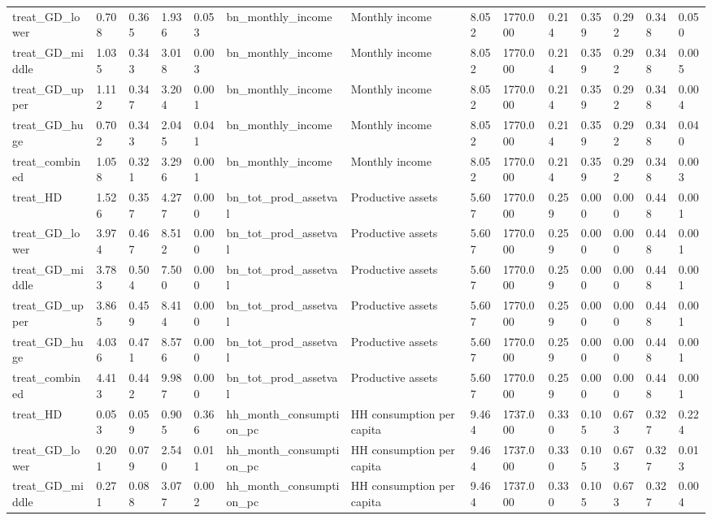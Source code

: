 \begin{tabular}{llllllllllllll}
treat\_GD\_lower & 0.708 & 0.365 & 1.936 & 0.053 & bn\_monthly\_income & Monthly income & 8.052 & 1770.000 & 0.214 & 0.359 & 0.292 & 0.348 & 0.050 \\
treat\_GD\_middle & 1.035 & 0.343 & 3.018 & 0.003 & bn\_monthly\_income & Monthly income & 8.052 & 1770.000 & 0.214 & 0.359 & 0.292 & 0.348 & 0.005 \\
treat\_GD\_upper & 1.112 & 0.347 & 3.204 & 0.001 & bn\_monthly\_income & Monthly income & 8.052 & 1770.000 & 0.214 & 0.359 & 0.292 & 0.348 & 0.004 \\
treat\_GD\_huge & 0.702 & 0.343 & 2.045 & 0.041 & bn\_monthly\_income & Monthly income & 8.052 & 1770.000 & 0.214 & 0.359 & 0.292 & 0.348 & 0.040 \\
treat\_combined & 1.058 & 0.321 & 3.296 & 0.001 & bn\_monthly\_income & Monthly income & 8.052 & 1770.000 & 0.214 & 0.359 & 0.292 & 0.348 & 0.003 \\
treat\_HD & 1.526 & 0.357 & 4.277 & 0.000 & bn\_tot\_prod\_assetval & Productive assets & 5.607 & 1770.000 & 0.259 & 0.000 & 0.000 & 0.448 & 0.001 \\
treat\_GD\_lower & 3.974 & 0.467 & 8.512 & 0.000 & bn\_tot\_prod\_assetval & Productive assets & 5.607 & 1770.000 & 0.259 & 0.000 & 0.000 & 0.448 & 0.001 \\
treat\_GD\_middle & 3.783 & 0.504 & 7.500 & 0.000 & bn\_tot\_prod\_assetval & Productive assets & 5.607 & 1770.000 & 0.259 & 0.000 & 0.000 & 0.448 & 0.001 \\
treat\_GD\_upper & 3.865 & 0.459 & 8.414 & 0.000 & bn\_tot\_prod\_assetval & Productive assets & 5.607 & 1770.000 & 0.259 & 0.000 & 0.000 & 0.448 & 0.001 \\
treat\_GD\_huge & 4.036 & 0.471 & 8.576 & 0.000 & bn\_tot\_prod\_assetval & Productive assets & 5.607 & 1770.000 & 0.259 & 0.000 & 0.000 & 0.448 & 0.001 \\
treat\_combined & 4.413 & 0.442 & 9.987 & 0.000 & bn\_tot\_prod\_assetval & Productive assets & 5.607 & 1770.000 & 0.259 & 0.000 & 0.000 & 0.448 & 0.001 \\
treat\_HD & 0.053 & 0.059 & 0.905 & 0.366 & hh\_month\_consumption\_pc & HH consumption per capita & 9.464 & 1737.000 & 0.330 & 0.105 & 0.673 & 0.327 & 0.224 \\
treat\_GD\_lower & 0.201 & 0.079 & 2.540 & 0.011 & hh\_month\_consumption\_pc & HH consumption per capita & 9.464 & 1737.000 & 0.330 & 0.105 & 0.673 & 0.327 & 0.013 \\
treat\_GD\_middle & 0.271 & 0.088 & 3.077 & 0.002 & hh\_month\_consumption\_pc & HH consumption per capita & 9.464 & 1737.000 & 0.330 & 0.105 & 0.673 & 0.327 & 0.004 \\

\end{tabular}
